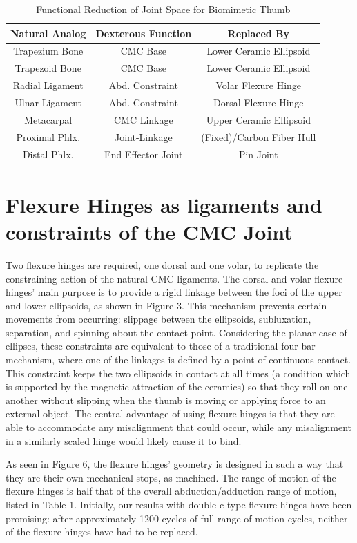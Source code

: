 \documentclass[letterpaper, 10 pt, conference]{ieeeconf}
\begin{document}
\begin{table}
\vspace{4pt}
	\centering
	\caption{Functional Reduction of Joint Space for Biomimetic Thumb}\label{DOFchoice}
	\begin{tabular}{c|c|c}
		Natural Analog & Dexterous Function & Replaced By \\
		\hline
		Trapezium Bone & CMC Base & Lower Ceramic Ellipsoid \\
		Trapezoid Bone & CMC Base & Lower Ceramic Ellipsoid \\
		Radial Ligament& Abd. Constraint & Volar Flexure Hinge\\
		Ulnar Ligament & Abd. Constraint & Dorsal Flexure Hinge\\
		Metacarpal & CMC Linkage & Upper Ceramic Ellipsoid\\
		Proximal Phlx. & Joint-Linkage & (Fixed)/Carbon Fiber Hull\\
	    Distal Phlx. & End Effector Joint & Pin Joint\\
		\hline
	\end{tabular}
\end{table}

\section{Flexure Hinges as ligaments and constraints of the CMC Joint}
Two flexure hinges are required, one dorsal and one volar, to replicate the constraining action of the natural CMC ligaments. The dorsal and volar  flexure hinges' main purpose is to provide a rigid linkage between the foci of the upper and lower ellipsoids, as shown in Figure 3. This mechanism prevents certain movements from occurring: slippage between the ellipsoids, subluxation, separation, and spinning about the contact point. Considering the planar case of ellipses, these constraints are equivalent to those of a traditional four-bar mechanism, where one of the linkages is defined by a point of continuous contact. This constraint keeps the two ellipsoids in contact at all times (a condition which is supported by the magnetic attraction of the ceramics) so that they roll on one another without slipping when the thumb is moving or applying force to an external object. The central advantage of using flexure hinges is that they are able to accommodate any misalignment that could occur, while any misalignment in a similarly scaled hinge would likely cause it to bind.

As seen in Figure 6, the flexure hinges' geometry is designed in such a way that they are their own mechanical stops, as machined. The range of motion of the flexure hinges is half that of the overall abduction/adduction range of motion, listed in Table 1. Initially, our results with double c-type flexure hinges have been promising: after approximately 1200 cycles of full range of motion cycles, neither of the flexure hinges have had to be replaced. 
\end{document}
